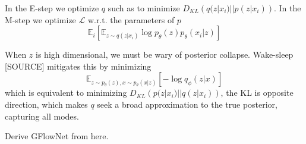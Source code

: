 In the E-step we optimize $q$ such as to minimize $D_{KL}\left( q(z|x_i) || p(z|x_i) \right)$.
In the M-step we optimize $\mathcal{L}$ w.r.t. the parameters of $p$
$$ \mathbb{E}_i \left[ \mathbb{E}_{z \sim q(z|x_i)} \log p_\theta(z) p_\theta(x_i|z) \right] $$

When $z$ is high dimensional, we must be wary of posterior collapse. Wake-sleep [SOURCE] mitigates this by minimizing $$ \mathbb{E}_{z \sim p_\theta(z), x \sim p_\theta(x|z)} \left[- \log q_\phi (z|x)\right] $$ which is equivalent to minimizing $D_{KL}\left( p(z|x_i) || q(z|x_i) \right)$, the KL is opposite direction, which makes $q$ seek a broad approximation to the true posterior, capturing all modes. 

Derive GFlowNet from here.


